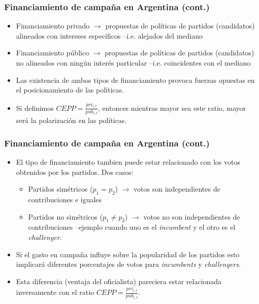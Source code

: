 \documentclass[handout,final,xcolor=dvipsnames]{beamer}
\begin{document}
\begin{frame}\frametitle{Financiamiento de campaña en Argentina (cont.)}
\begin{itemize}\itemsep 15pt\item Financiamiento privado $\longrightarrow$ propuestas de políticas
  de partidos (candidatos) alineados con intereses específicos
  --i.e. alejados del mediano
\item Financiamiento público $\longrightarrow$ propuestas de políticas
  de partidos (candidatos) no alineados con ningún interés particular
  --i.e. coincidentes con el mediano
\item Las existencia de ambos tipos de financiamiento provoca fuerzas
  opuestas en el posicionamiento de las políticas.
\item Si definimos $CEPP=\frac{pri_{i,t}}{pub_{i,t}}$, entonces
  mientras mayor sea este ratio, mayor será la polarización en las
  políticas.
\end{itemize}
\end{frame}

\begin{frame}\frametitle{Financiamiento de campaña en Argentina (cont.)}
\begin{itemize}\itemsep 10pt
\item El tipo de financiamiento tambien puede estar relacionado con los votos
  obtenidos por los partidos. Dos casos:
\begin{itemize}\itemsep 15pt
\item Partidos simétricos ($p_1=p_2$) $\longrightarrow$ votos son independientes
  de contribuciones e iguales
\item Partidos no simétricos ($p_1 \neq p_2$) $\longrightarrow$ votos
  no son independientes de contribuciones --ejemplo cuando uno es el
  \textit{incumbent} y el otro es el \textit{challenger}.
\end{itemize}
\item Si el gasto en campaña influye sobre la popularidad de los
  partidos esto implicará diferentes porcentajes de votos para
  \textit{incumbents} y \textit{challengers}.
\item Esta diferencia (ventaja del oficialista)
  pareciera estar relacionada
  inversamente con el ratio  $CEPP=\frac{pri_{i,t}}{pub_{i,t}}$.
\end{itemize}
\end{frame}
\end{document}
